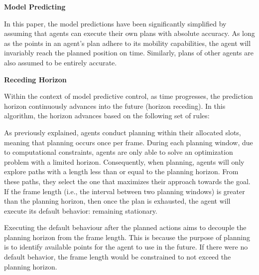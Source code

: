 \textbf{Model Predicting}

In this paper, the model predictions have been significantly simplified by assuming that agents can execute their own plans with absolute accuracy.
As long as the points in an agent's plan adhere to its mobility capabilities, the agent will invariably reach the planned position on time. Similarly, plans of other agents are also assumed to be entirely accurate.


\textbf{Receding Horizon}

Within the context of model predictive control, as time progresses, the prediction horizon continuously advances into the future (horizon receding).
In this algorithm, the horizon advances based on the following set of rules:

As previously explained, agents conduct planning within their allocated slots, meaning that planning occurs once per frame.
During each planning window, due to computational constraints, agents are only able to solve an optimization problem with a limited horizon. Consequently, when planning, agents will only explore paths with a length less than or equal to the planning horizon. From these paths, they select the one that maximizes their approach towards the goal.
If the frame length (i.e., the interval between two planning windows) is greater than the planning horizon, then once the plan is exhausted, the agent will execute its default behavior: remaining stationary.

Executing the default behaviour after the planned actions aims to decouple the planning horizon from the frame length. This is because the purpose of planning is to identify available points for the agent to use in the future. If there were no default behavior, the frame length would be constrained to not exceed the planning horizon.

